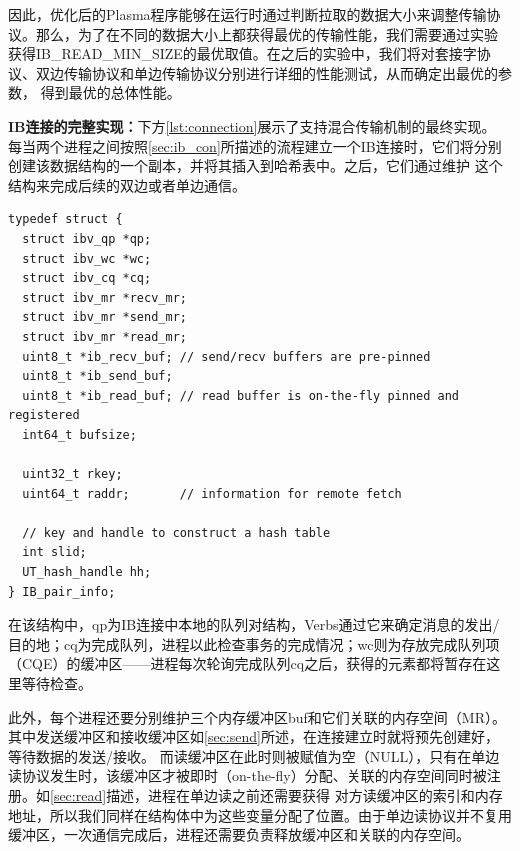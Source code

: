 因此，优化后的Plasma程序能够在运行时通过判断拉取的数据大小来调整传输协议。那么，为了在不同的数据大小上都获得最优的传输性能，我们需要通过实验
获得IB\_READ\_MIN\_SIZE的最优取值。在之后的实验中，我们将对套接字协议、双边传输协议和单边传输协议分别进行详细的性能测试，从而确定出最优的参数，
得到最优的总体性能。

\textbf{IB连接的完整实现：}下方\autoref{lst:connection}展示了支持混合传输机制的最终实现。
每当两个进程之间按照\autoref{sec:ib_con}所描述的流程建立一个IB连接时，它们将分别创建该数据结构的一个副本，并将其插入到哈希表中。之后，它们通过维护
这个结构来完成后续的双边或者单边通信。

\begin{minipage}{\linewidth}
\begin{lstlisting}[style=sysucpp, label={lst:connection}]
typedef struct {
  struct ibv_qp *qp;
  struct ibv_wc *wc;
  struct ibv_cq *cq;
  struct ibv_mr *recv_mr;
  struct ibv_mr *send_mr;
  struct ibv_mr *read_mr;
  uint8_t *ib_recv_buf; // send/recv buffers are pre-pinned
  uint8_t *ib_send_buf;
  uint8_t *ib_read_buf; // read buffer is on-the-fly pinned and registered
  int64_t bufsize;

  uint32_t rkey;
  uint64_t raddr;		// information for remote fetch

  // key and handle to construct a hash table
  int slid;
  UT_hash_handle hh;
} IB_pair_info;
\end{lstlisting}
\end{minipage}

在该结构中，qp为IB连接中本地的队列对结构，Verbs通过它来确定消息的发出/目的地；cq为完成队列，进程以此检查事务的完成情况；wc则为存放完成队列项（CQE）的缓冲区——进程每次轮询完成队列cq之后，获得的元素都将暂存在这里等待检查。

此外，每个进程还要分别维护三个内存缓冲区buf和它们关联的内存空间（MR）。其中发送缓冲区和接收缓冲区如\autoref{sec:send}所述，在连接建立时就将预先创建好，等待数据的发送/接收。
而读缓冲区在此时则被赋值为空（NULL），只有在单边读协议发生时，该缓冲区才被即时（on-the-fly）分配、关联的内存空间同时被注册。如\autoref{sec:read}描述，进程在单边读之前还需要获得
对方读缓冲区的索引和内存地址，所以我们同样在结构体中为这些变量分配了位置。由于单边读协议并不复用缓冲区，一次通信完成后，进程还需要负责释放缓冲区和关联的内存空间。